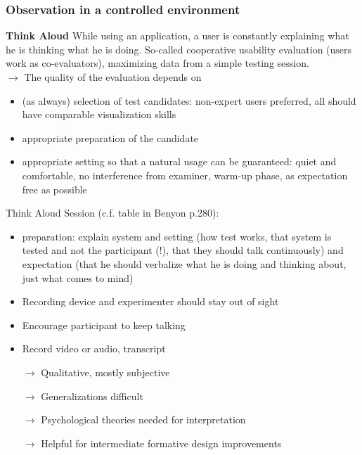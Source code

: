 \subsubsection{Observation in a controlled environment}
\textbf{Think Aloud}
While using an application, a user is constantly explaining what he is thinking what he is doing. So-called cooperative usability evaluation (users work as co-evaluators), maximizing data from a simple testing session.\\
$\rightarrow$ The quality of the evaluation depends on 
\begin{itemize}
\item (as always) selection of test candidates: non-expert users preferred, all should have comparable visualization skills
\item appropriate preparation of the candidate
\item appropriate setting so that a natural usage can be guaranteed: quiet and comfortable, no interference from examiner, warm-up phase, as expectation free as possible
\end{itemize}
Think Aloud Session (c.f. table in Benyon p.280):
\begin{itemize}
\item preparation: explain system and setting (how test works, that system is tested and not the participant (!), that they should talk continuously) and expectation (that he should verbalize what he is doing and thinking about, just what comes to mind)
\item Recording device and experimenter should stay out of sight
\item Encourage participant to keep talking
\item Record video or audio, transcript
\item[$\rightarrow$] Qualitative, mostly subjective
\item[$\rightarrow$] Generalizations difficult
\item[$\rightarrow$] Psychological theories needed for interpretation
\item[$\rightarrow$] Helpful for intermediate formative design improvements
\end{itemize}

